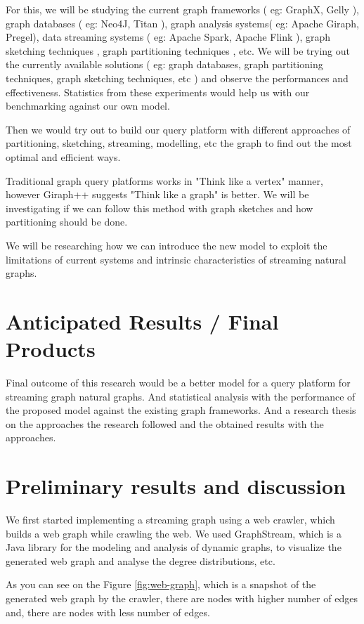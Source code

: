 \documentclass[12pt]{article}
\begin{document}
For this, we will be studying the current graph frameworks ( eg: GraphX, Gelly ), graph databases ( eg: Neo4J, Titan ), graph analysis systems( eg: Apache Giraph, Pregel), data streaming systems ( eg: Apache Spark, Apache Flink ), graph sketching techniques \cite{GraphSketches}, graph partitioning techniques \cite{PowerGraph} \cite{S-PowerGraph}, etc. We will be trying out the currently available solutions ( eg: graph databases, graph partitioning techniques, graph sketching techniques, etc ) and observe the performances and effectiveness. Statistics from these experiments would help us with our benchmarking against our own model. 

 Then we would try out to build our query platform with different approaches of partitioning, sketching, streaming, modelling, etc the graph to find out the most optimal and efficient ways. 
 
 Traditional graph query platforms works in "Think like a vertex" manner, however Giraph++ \cite{GiraphPlusPlus} suggests "Think like a graph" is better. We will be investigating if we can follow this method with graph sketches and how partitioning should be done.

We will be researching how we can introduce the new model to exploit the limitations of current systems and intrinsic characteristics of streaming natural graphs.

\clearpage 
\section{Anticipated Results / Final Products }
Final outcome of this research would be a better model for a query platform for streaming graph natural graphs. And statistical analysis with the performance of the proposed model against the existing graph frameworks. And a research thesis on the approaches the research followed and the obtained results with the approaches. 
 
\section{Preliminary results and discussion}

We first started implementing a streaming graph using a web crawler, which builds a web graph while crawling the web. We used  GraphStream, which is a Java library for the modeling and analysis of dynamic graphs, to visualize the generated web graph and analyse the degree distributions, etc. 

As you can see on the Figure \ref{fig:web-graph}, which is a snapshot of the generated web graph by the crawler, there are nodes with higher number of edges and, there are nodes with less number of edges.
\end{document}
